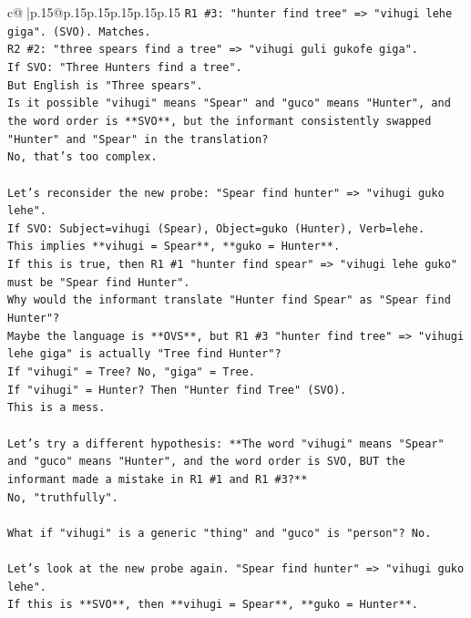 \documentclass{article}
\begin{document}
{\begin{supertabular}{c@{$\;$}|p{.15\linewidth}@{}p{.15\linewidth}p{.15\linewidth}p{.15\linewidth}p{.15\linewidth}p{.15\linewidth}}
{{{\texttt{R1 \#3: "hunter find tree" => "vihugi lehe giga". (SVO). Matches.} \\
\texttt{R2 \#2: "three spears find a tree" => "vihugi guli gukofe giga".} \\
\texttt{If SVO: "Three Hunters find a tree".} \\
\texttt{But English is "Three spears".} \\
\texttt{Is it possible "vihugi" means "Spear" and "guco" means "Hunter", and the word order is **SVO**, but the informant consistently swapped "Hunter" and "Spear" in the translation?} \\
\texttt{No, that's too complex.} \\
\\ 
\texttt{Let's reconsider the new probe: "Spear find hunter" => "vihugi guko lehe".} \\
\texttt{If SVO: Subject=vihugi (Spear), Object=guko (Hunter), Verb=lehe.} \\
\texttt{This implies **vihugi = Spear**, **guko = Hunter**.} \\
\texttt{If this is true, then R1 \#1 "hunter find spear" => "vihugi lehe guko" must be "Spear find Hunter".} \\
\texttt{Why would the informant translate "Hunter find Spear" as "Spear find Hunter"?} \\
\texttt{Maybe the language is **OVS**, but R1 \#3 "hunter find tree" => "vihugi lehe giga" is actually "Tree find Hunter"?} \\
\texttt{If "vihugi" = Tree? No, "giga" = Tree.} \\
\texttt{If "vihugi" = Hunter? Then "Hunter find Tree" (SVO).} \\
\texttt{This is a mess.} \\
\\ 
\texttt{Let's try a different hypothesis: **The word "vihugi" means "Spear" and "guco" means "Hunter", and the word order is SVO, BUT the informant made a mistake in R1 \#1 and R1 \#3?**} \\
\texttt{No, "truthfully".} \\
\\ 
\texttt{What if "vihugi" is a generic "thing" and "guco" is "person"? No.} \\
\\ 
\texttt{Let's look at the new probe again. "Spear find hunter" => "vihugi guko lehe".} \\
\texttt{If this is **SVO**, then **vihugi = Spear**, **guko = Hunter**.} \\
}}}
\end{supertabular}}
\end{document}
